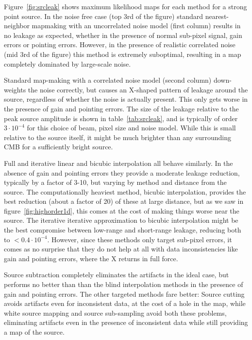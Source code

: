 \documentclass{article}
\begin{document}
Figure~\ref{fig:srcleak} shows maximum likelihood maps for each method for a strong point source.
In the noise free case (top 3rd of the figure) standard nearest-neighbor mapmaking
with an uncorrelated noise model (first column) results in no leakage as expected, whether in the
presence of normal sub-pixel signal, gain errors or pointing errors. However, in the presence
of realistic correlated noise (mid 3rd of the figure) this method is extremely suboptimal,
resulting in a map completely
dominated by large-scale noise.

Standard map-making with a correlated noise model (second column)
down-weights the noise correctly, but causes an X-shaped pattern of leakage around the
source, regardless of whether the noise is actually present. This only gets worse in
the presence of gain and pointing errors. The size of the leakage relative to
the peak source amplitude is shown in table~\ref{tab:srcleak}, and is typically of order $3\cdot 10^{-4}$ for
this choice of beam, pixel size and noise model. While
this is small relative to the source itself, it might be much brighter than any
surrounding CMB for a sufficiently bright source.

Full and iterative linear and bicubic interpolation all behave similarly.
In the absence of gain and pointing errors they provide a moderate leakage reduction,
typically by a factor of 3-10, but varying by method and distance from the source.
The computationally heaviest method, bicubic interpolation, provides the best reduction (about a factor
of 20) of these at large distance, but as we saw in figure~\ref{fig:highorder1d}, this comes at the cost of making
things worse near the source.
The iterative iterative approximation to bicubic interpolation might be the best compromise
between low-range and short-range leakage, reducing both to $<0.4 \cdot 10^{-4}$.
However, since these methods only target sub-pixel
errors, it comes as no surprise that they do not help at all with data inconsistencies
like gain and pointing errors, where the X returns in full force.

Source subtraction completely eliminates the artifacts in the ideal case, but
performs no better than than the blind interpolation methods in the presence of gain
and pointing errors. The other targeted methods fare better:
Source cutting avoids artifacts even for inconsistent data, at the cost of a hole in the map,
while white source mapping and source sub-sampling avoid both these problems,
eliminating artifacts even in the presence of inconsistent data while still providing
a map of the source.
\end{document}
